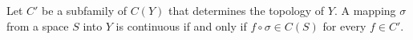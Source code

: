 Let $C'$ be a subfamily of $C(Y)$ that determines the topology of $Y$. A mapping $\sigma$ from a space $S$ into $Y$ is continuous if and only if $f \circ \sigma \in C(S)$ for every $f \in C'$.
